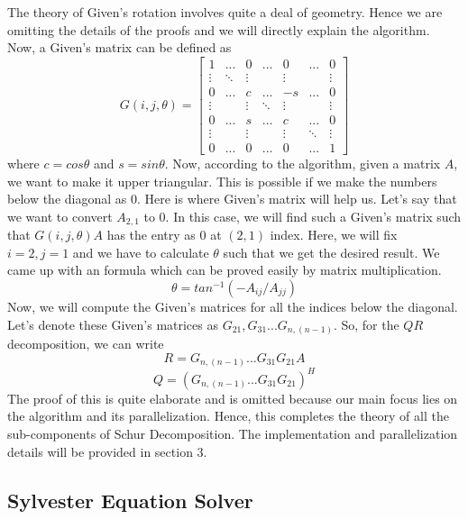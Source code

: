 \documentclass[12pt,a4paper]{article}
\begin{document}
The theory of Given's rotation involves quite a deal of geometry. Hence we are omitting the details of the proofs and we will directly explain the algorithm. Now, a Given's matrix can be defined as
$$G(i, j, \theta) = 
\begin{bmatrix} 
1 & ... & 0 & ... & 0 & ... & 0 \\
\vdots & \ddots & \vdots & & \vdots & & \vdots \\
0 & ... & c & ... & -s & ... & 0 \\
\vdots & & \vdots & \ddots & \vdots & & \vdots \\
0 & ... & s & ... & c & ... & 0 \\
\vdots & & \vdots & & \vdots & \ddots & \vdots \\
0 & ... & 0 & ... & 0 & ... & 1 
\end{bmatrix}$$
where $c = cos\theta$ and $s = sin\theta$. Now, according to the algorithm, given a matrix $A$, we want to make it upper triangular. This is possible if we make the numbers below the diagonal as $0$. Here is where Given's matrix will help us. Let's say that we want to convert $A_{2, 1}$ to $0$. In this case, we will find such a Given's matrix such that $G(i, j, \theta)A$ has the entry as $0$ at $(2, 1)$ index. Here, we will fix $i = 2, j = 1$ and we have to calculate $\theta$ such that we get the desired result. We came up with an formula which can be proved easily by matrix multiplication.
$$\theta = tan^{-1}(-A_{ij} / A_{jj})$$
\newpage
Now, we will compute the Given's matrices for all the indices below the diagonal. Let's denote these Given's matrices as $G_{21}, G_{31}...G_{n,(n-1)}$. So, for the $QR$ decomposition, we can write
$$R = G_{n,(n-1)}...G_{31}G_{21}A$$
$$Q = (G_{n, (n-1)}...G_{31}G_{21})^{H}$$
The proof of this is quite elaborate and is omitted because our main focus lies on the algorithm and its parallelization. Hence, this completes the theory of all the sub-components of Schur Decomposition. The implementation and parallelization details will be provided in section 3.

\subsection{Sylvester Equation Solver}
\end{document}
